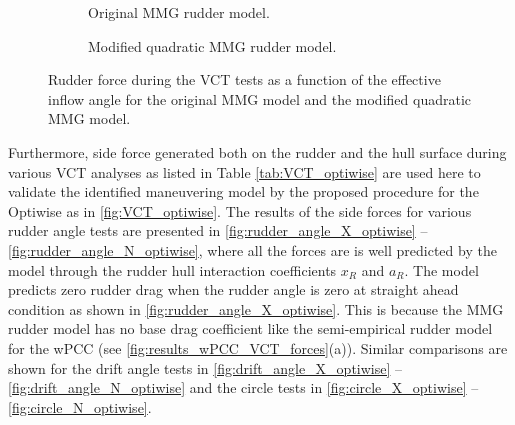 \begin{figure}[h]
     \centering
     \begin{subfigure}[b]{0.49\textwidth}
         \centering
         
        \caption{Original MMG rudder model.}
        \label{fig:Y_R_MMG_original}
     \end{subfigure}
     \hfill
     \begin{subfigure}[b]{0.49\textwidth}
         \centering
         
        \caption{Modified quadratic MMG rudder model.}
        \label{fig:Y_R_MMG_quadratic}
     \end{subfigure}
    \caption{Rudder force during the VCT tests as a function of the effective inflow angle for the original MMG model and the modified quadratic MMG model.}
    \label{fig:MMG_quadratic}
\end{figure}

Furthermore, side force generated both on the rudder and the hull surface during various VCT analyses as listed in Table \ref{tab:VCT_optiwise} are used here to validate the identified maneuvering model by the proposed procedure for the Optiwise as in \autoref{fig:VCT_optiwise}. The results of the side forces for various rudder angle tests are presented in \autoref{fig:rudder_angle_X_optiwise} -- \autoref{fig:rudder_angle_N_optiwise}, where all the forces are is well predicted by the model through the rudder hull interaction coefficients $x_R$ and $a_R$. 
The model predicts zero rudder drag when the rudder angle is zero at straight ahead condition as shown in \autoref{fig:rudder_angle_X_optiwise}. This is because the MMG rudder model has no base drag coefficient like the semi-empirical rudder model for the wPCC (see \autoref{fig:results_wPCC_VCT_forces}(a)).
Similar comparisons are shown for the drift angle tests in \autoref{fig:drift_angle_X_optiwise} -- \autoref{fig:drift_angle_N_optiwise} and the circle tests in \autoref{fig:circle_X_optiwise} -- \autoref{fig:circle_N_optiwise}. 


